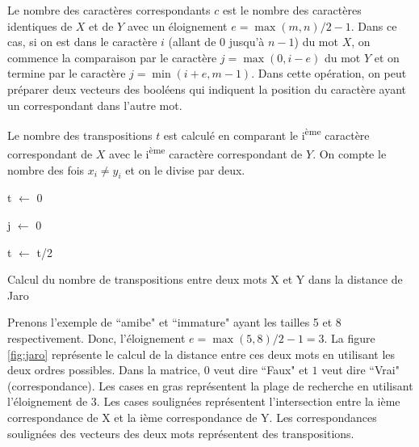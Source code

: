 \documentclass{KodeBook}
\begin{document}
Le nombre des caractères correspondants $c$  est le nombre des caractères identiques de $X$ et de $Y$ avec un éloignement $ e= \max (m, n)/2 - 1$. Dans ce cas, si on est dans le caractère $i$ (allant de $0$ jusqu'à $n-1$) du mot $X$, on commence la comparaison par le caractère $j=\max(0, i - e)$ du mot $Y$ et on termine par le caractère $j=\min(i+e, m-1)$.
Dans cette opération, on peut préparer deux vecteurs des booléens qui indiquent la position du caractère ayant un correspondant dans l'autre mot.

Le nombre des transpositions $t$ est calculé en comparant le i\textsuperscript{ème} caractère correspondant de $X$ avec le i\textsuperscript{ème} caractère correspondant de $Y$. On compte le nombre des fois $x_i \ne y_i$  et on le divise par deux.
\begin{algorithm}[H]
	t $\leftarrow$ 0\;
	
	j $\leftarrow$ 0\;
	
    
    t $\leftarrow$ t/2\;
    
    \caption{Calcul du nombre de transpositions entre deux mots X et Y dans la distance de Jaro \label{algo:jaro-transpo}}
	
\end{algorithm}

Prenons l'exemple de ``amibe"  et ``immature" ayant les tailles 5 et 8 respectivement.
Donc, l'éloignement $e=\max(5, 8)/2 - 1 = 3$.
La figure \ref{fig:jaro} représente le calcul de la distance entre ces deux mots en utilisant les deux ordres possibles.
Dans la matrice, $0$ veut dire ``Faux" et $1$  veut dire ``Vrai" (correspondance). 
Les cases en gras représentent la plage de recherche en utilisant l'éloignement de 3. 
Les cases soulignées représentent l'intersection entre la ième correspondance de X et la ième correspondance de Y.
Les correspondances soulignées des vecteurs des deux mots représentent des transpositions. 
\end{document}
